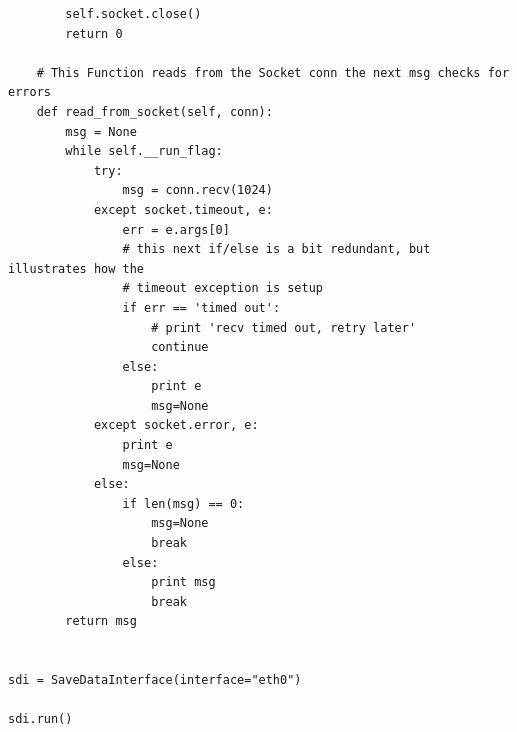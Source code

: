 \begin{lstlisting}
        self.socket.close()
        return 0

    # This Function reads from the Socket conn the next msg checks for errors
    def read_from_socket(self, conn):
        msg = None
        while self.__run_flag:
            try:
                msg = conn.recv(1024)
            except socket.timeout, e:
                err = e.args[0]
                # this next if/else is a bit redundant, but illustrates how the
                # timeout exception is setup
                if err == 'timed out':
                    # print 'recv timed out, retry later'
                    continue
                else:
                    print e
                    msg=None
            except socket.error, e:
                print e
                msg=None
            else:
                if len(msg) == 0:
                    msg=None
                    break
                else:
                    print msg
                    break
        return msg


sdi = SaveDataInterface(interface="eth0")

sdi.run()
\end{lstlisting}